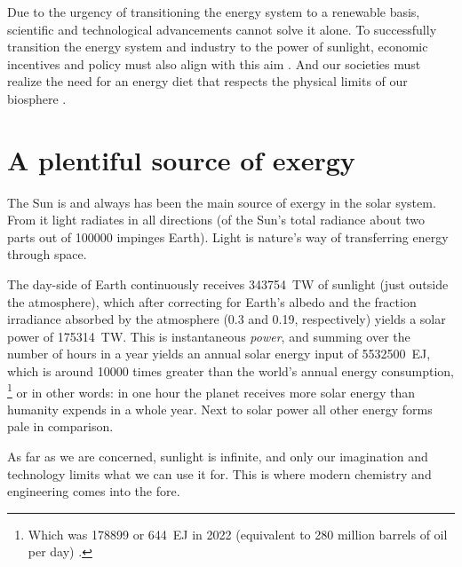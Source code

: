 \documentclass[draft,webedition,openright,titles,swedish,english]{LuaUUThesis}\usepackage[]{graphicx}\usepackage[]{xcolor}
\newcommand{\seemore}[1]{\marginnote{%
   \noindent\tikz[baseline=(current bounding box.south)]%
   \node[text width=0.8\marginparwidth,align=left,rectangle,rounded corners,fill=blondsvag,font=\scriptsize]{#1};%
}}
\begin{document}
Due to the urgency of transitioning the energy system to a renewable basis,
scientific and technological advancements cannot solve it alone.
To successfully transition the energy system and industry to the power of sunlight,
economic incentives and policy must also align with this aim \cite{Nordhaus1972,Nordhaus1994,IRENA2019}.
And our societies must realize the need for an energy diet that respects
the physical limits of our biosphere \cite{Persson2022,Meadows1972}.




\section{A plentiful source of exergy}
\label{intro:solar-spectrum}


The Sun is and always has been the main source of exergy in the solar system.
From it light radiates in all directions (of the Sun's total radiance about
two parts out of \num{100000} impinges Earth).
Light is nature's way of transferring energy through space.%
%





The day-side of Earth continuously receives
\qty{343754}{\tera\watt}
of sunlight (just outside the atmosphere), which after correcting
for Earth's albedo and the fraction irradiance absorbed by the atmosphere
(0.3 and 0.19, respectively)
yields a solar power of
\qty{175314}{\tera\watt}.%
\seemore{\cref{photoec}}%
This is instantaneous \emph{power}, and summing over the number of hours in a year
yields an annual solar energy input of
\qty{ 5532500}{\exa\joule},
which is around \num{10000} times greater than the world's annual energy consumption,%
\footnote{%
   Which was \qty{178899}{\TWh} or \qty{644}{\exa\joule} in 2022
   (equivalent to 280 million barrels of oil per day) \cite{Wolfson2018}.
}
or in other words: in one hour the planet receives more solar energy than humanity
expends in a whole year.
Next to solar power all other energy forms pale in comparison.

As far as we are concerned, sunlight is infinite, and only our imagination and
technology limits what we can use it for.
This is where modern chemistry and engineering comes into the fore.

%
\end{document}
